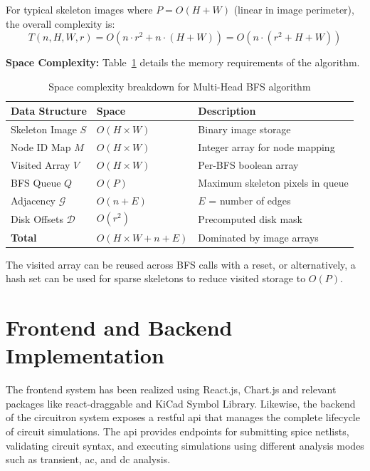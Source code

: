 For typical skeleton images where $P = O(H + W)$ (linear in image perimeter), the overall complexity is:
\[
T(n, H, W, r) = O(n \cdot r^2 + n \cdot (H + W)) = O(n \cdot (r^2 + H + W))
\]

\textbf{Space Complexity:} Table~\ref{tab:space_complexity} details the memory requirements of the algorithm.

\begin{table}[H]
\centering
\begin{tabular}{@{}lll@{}}
\toprule
\textbf{Data Structure} & \textbf{Space} & \textbf{Description} \\
\midrule
Skeleton Image $S$ & $O(H \times W)$ & Binary image storage \\
Node ID Map $M$ & $O(H \times W)$ & Integer array for node mapping \\
Visited Array $V$ & $O(H \times W)$ & Per-BFS boolean array \\
BFS Queue $Q$ & $O(P)$ & Maximum skeleton pixels in queue \\
Adjacency $\mathcal{G}$ & $O(n + E)$ & $E$ = number of edges \\
Disk Offsets $\mathcal{D}$ & $O(r^2)$ & Precomputed disk mask \\
\midrule
\textbf{Total} & $O(H \times W + n + E)$ & Dominated by image arrays \\
\bottomrule
\end{tabular}
\caption{Space complexity breakdown for Multi-Head BFS algorithm}
\label{tab:space_complexity}
\end{table}

The visited array can be reused across BFS calls with a reset, or alternatively, a hash set can be used for sparse skeletons to reduce visited storage to $O(P)$.


\section{Frontend and Backend Implementation}

The frontend system has been realized using React.js, Chart.js and relevant packages like react-draggable and KiCad Symbol Library. Likewise, the backend of the \gls{circuitron} system exposes a \gls{restful} \gls{api} that manages the complete lifecycle of circuit simulations. The \gls{api} provides endpoints for submitting \gls{spice} netlists, validating circuit syntax, and executing simulations using different analysis modes such as transient, \gls{ac}, and \gls{dc} analysis. 


